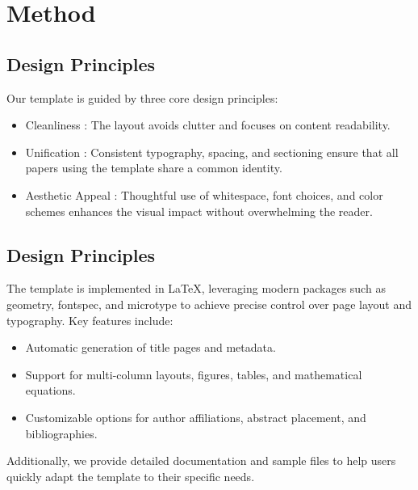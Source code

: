 \section{Method}
\label{sec:method}

\subsection{Design Principles}

Our template is guided by three core design principles:

\begin{itemize}[leftmargin=7mm,itemsep=2mm, topsep=0em]
    \item Cleanliness : The layout avoids clutter and focuses on content readability.
    
    \item Unification : Consistent typography, spacing, and sectioning ensure that all papers using the template share a common identity.
    
    \item Aesthetic Appeal : Thoughtful use of whitespace, font choices, and color schemes enhances the visual impact without overwhelming the reader.
\end{itemize}

\subsection{Design Principles}

The template is implemented in LaTeX, leveraging modern packages such as geometry, fontspec, and microtype to achieve precise control over page layout and typography. Key features include:

\begin{itemize}[leftmargin=7mm,itemsep=2mm, topsep=0em]
    \item Automatic generation of title pages and metadata.
    
    \item Support for multi-column layouts, figures, tables, and mathematical equations.
    
    \item Customizable options for author affiliations, abstract placement, and bibliographies.
\end{itemize}

Additionally, we provide detailed documentation and sample files to help users quickly adapt the template to their specific needs.

